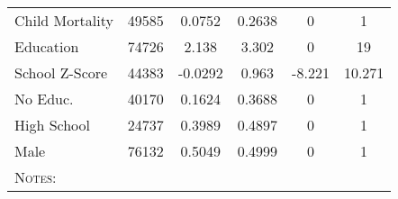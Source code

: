 \begin{table}[htpb!]
\begin{center}
\begin{tabular}{lccccc}
Child Mortality &     49585  &  0.0752 &    0.2638 &          0     &     1\\
Education &     74726 &   2.138 &    3.302 &          0       &  19\\
School Z-Score &     44383  & -0.0292 &    0.963 &  -8.221  & 10.271 \\
No Educ. &     40170   & 0.1624  &   0.3688 &          0       &   1\\
High School &     24737   & 0.3989 &    0.4897 &          0     &     1\\
Male &     76132  &  0.5049 &    0.4999 &        0       &   1\\ \bottomrule
\multicolumn{6}{p{8cm}}{\textsc{Notes:}} \\ \midrule
\end{tabular}\end{center}\end{table} 
